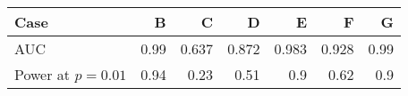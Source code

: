 \begin{tabular}{l|rrrrrr}
Case & B & C & D & E & F & G \\ \hline
AUC &  0.99  &  0.637  &  0.872  &  0.983  &  0.928  &  0.99 \\ Power at $p=0.01$ & 0.94  &  0.23  &  0.51  &  0.9  &  0.62  &  0.9 \\
 \end{tabular}
